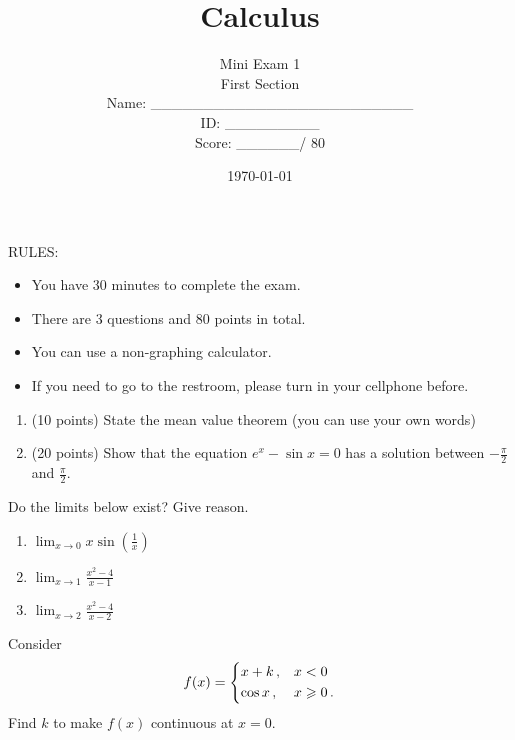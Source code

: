 \documentclass[12pt]{amsart}
\title{ Calculus }
\author{  Mini Exam 1 \\ First Section \\ \vspace{1cm} Name: \_\_\_\_\_\_\_\_\_\_\_\_\_\_\_\_\_\_\_\_\_\_\_\_\_  
\\ \vspace{1cm} ID: \_\_\_\_\_\_\_\_\_ \\ \vspace{1cm} Score: \_\_\_\_\_\_/ 80}
\date{\today}
\begin{document}
\maketitle


RULES:
\begin{itemize}
	\item You have 30 minutes to complete the exam.
	\item There are 3 questions and 80 points in total.
	\item You can use a non-graphing calculator.
	\item If you need to go to the restroom, please turn in your cellphone before.
\end{itemize}

\newpage

\begin{problem}[30 points]
\begin{enumerate}
	\item (10 points) State the mean value theorem (you can use your own words)
	      \vspace{8cm}
	\item (20 points) Show that the equation $e^x - \sin x = 0$ has a solution between $-\frac{\pi}2$ and $\frac\pi2$.
\end{enumerate}
\end{problem}

\pagebreak

\begin{problem}[30 points]
Do the limits below exist? Give reason.
\begin{enumerate}
	\item $\displaystyle \lim_{x \to 0} x \sin\left( \frac{1}{x} \right)$
	      \vspace{5cm}
	\item $\displaystyle \lim_{x \to 1} \frac{x^2 -4}{x-1} $
	      \vspace{5cm}
	\item $\displaystyle \lim_{x \to 2} \frac{x^2 - 4}{x-2}$
	      \vspace{5cm}
\end{enumerate}
\end{problem}

\newpage

\begin{problem}[20 points] Consider
\begin{equation*}
	f(x) = \begin{dcases}
		x + k \,,  & x<0         \\
		\cos x \,, & x\geq 0 \,.
	\end{dcases}
\end{equation*}
Find $k$ to make $f(x)$ continuous at $x = 0$.

\end{problem}


\printbibliography
%
%
\end{document}
